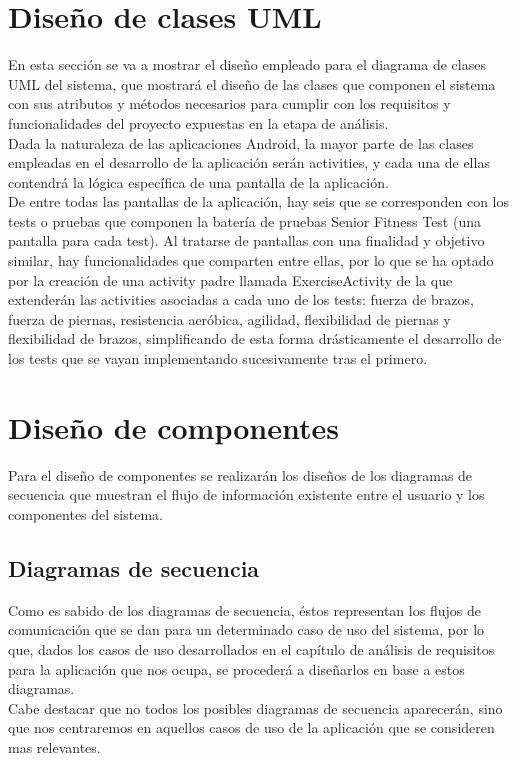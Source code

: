 \section{Diseño de clases UML}

En esta sección se va a mostrar el diseño empleado para el diagrama de clases UML del sistema, que mostrará el diseño de las clases que componen el sistema con sus atributos y métodos necesarios para cumplir con los requisitos y funcionalidades del proyecto expuestas en la etapa de análisis.\\

Dada la naturaleza de las aplicaciones Android, la mayor parte de las clases empleadas en el desarrollo de la aplicación serán activities, y cada una de ellas contendrá la lógica específica de una pantalla de la aplicación.\\

De entre todas las pantallas de la aplicación, hay seis que se corresponden con los tests o pruebas que componen la batería de pruebas Senior Fitness Test (una pantalla para cada test). Al tratarse de pantallas con una finalidad y objetivo similar, hay funcionalidades que comparten entre ellas, por lo que se ha optado por la creación de una activity padre llamada ExerciseActivity de la que extenderán las activities asociadas a cada uno de los tests: fuerza de brazos, fuerza de piernas, resistencia aeróbica, agilidad, flexibilidad de piernas y flexibilidad de brazos, simplificando de esta forma drásticamente el desarrollo de los tests que se vayan implementando sucesivamente tras el primero.\\

\section{Diseño de componentes}

Para el diseño de componentes se realizarán los diseños de los diagramas de secuencia que muestran el flujo de información existente entre el usuario y los componentes del sistema.

\subsection{Diagramas de secuencia}

Como es sabido de los diagramas de secuencia, éstos representan los flujos de comunicación que se dan para un determinado caso de uso del sistema, por lo que, dados los casos de uso desarrollados en el capítulo de análisis de requisitos para la aplicación que nos ocupa, se procederá a diseñarlos en base a estos diagramas.\\

Cabe destacar que no todos los posibles diagramas de secuencia aparecerán, sino que nos centraremos en aquellos casos de uso de la aplicación que se consideren mas relevantes.